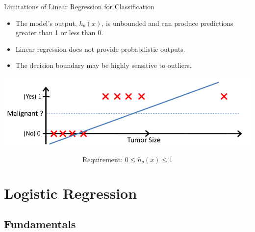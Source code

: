 \documentclass[serif, aspectratio=169]{beamer}
\begin{document}
    \begin{frame}{Limitations of Linear Regression for Classification}
        \begin{itemize}
            \item The model's output, $h_\theta(x)$, is unbounded and can produce predictions greater than 1 or less than 0.
            \item Linear regression does not provide probabilistic outputs.
            \item The decision boundary may be highly sensitive to outliers.
        \end{itemize}

        \vspace{0.5em}
        \centering
        \includegraphics[width=0.68\linewidth]{pic/lrClassification2.png}

        \[
            \text{Requirement: } 0 \le h_\theta(x) \le 1
        \]

    \end{frame}




    \section{Logistic Regression}

    \subsection{Fundamentals}
\end{document}
